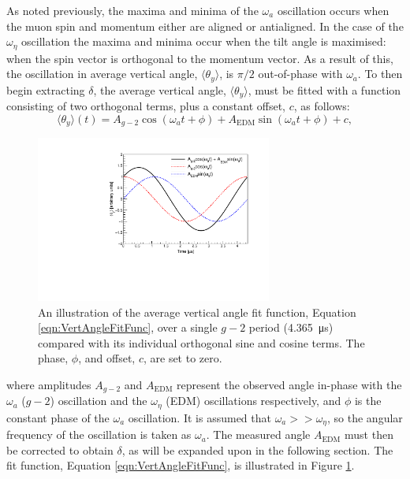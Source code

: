 As noted previously, the maxima and minima of the $\omega_{a}$ oscillation occurs when the muon spin and momentum either are aligned or antialigned. In the case of the $\omega_{\eta}$ oscillation the maxima and minima occur when the tilt angle is maximised: when the spin vector is orthogonal to the momentum vector. As a result of this, the oscillation in average vertical angle, $\langle \theta_{y} \rangle$, is $\pi/2$ out-of-phase with $\omega_{a}$. To then begin extracting $\delta$, the average vertical angle, $\langle\theta_{y}\rangle$, must be fitted with a function consisting of two orthogonal terms, plus a constant offset, $c$, as follows:
%
\begin{equation}
  \langle\theta_{y}\rangle(t)=A_{g-2}\cos(\omega_{a}t+\phi)+A_{\text{EDM}}\sin(\omega_{a}t+\phi) + c,   
  \label{eqn:VertAngleFitFunc}
\end{equation}
%
\begin{figure}[t!]
\centering{}
\includegraphics[trim={0 0 0 0},clip,width=0.69\textwidth]{Images/Chapter2/OrthogonalTermsIllustration.pdf}
\caption{An illustration of the average vertical angle fit function, Equation \ref{eqn:VertAngleFitFunc}, over a single $g-2$ period (\SI{4.365}{\micro\second}) compared with its individual orthogonal sine and cosine terms. The phase, $\phi$, and offset, $c$, are set to zero.}
\label{fig:OrthogonalTermsIllustration}
\end{figure}
%
where amplitudes $A_{g-2}$ and $A_{\text{EDM}}$ represent the observed angle in-phase with the $\omega_{a}$ ($g-2$) oscillation and the $\omega_{\eta}$ (EDM) oscillations respectively, and $\phi$ is the constant phase of the $\omega_{a}$ oscillation. It is assumed that $\omega_{a}>>\omega_{\eta}$, so the angular frequency of the oscillation is taken as $\omega_{a}$. The measured angle $A_{\text{EDM}}$ must then be corrected to obtain $\delta$, as will be expanded upon in the following section. The fit function, Equation \ref{eqn:VertAngleFitFunc}, is illustrated in Figure \ref{fig:OrthogonalTermsIllustration}.

